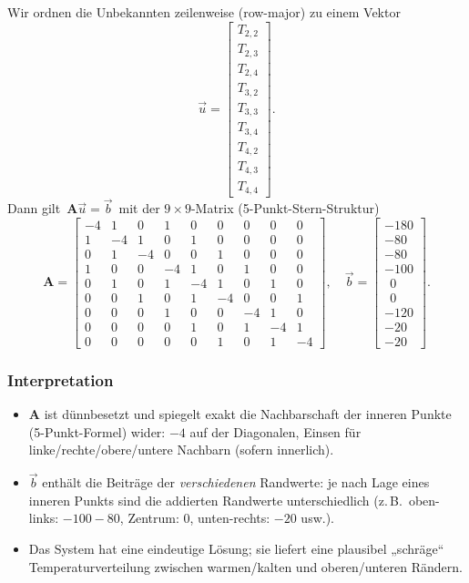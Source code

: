 Wir ordnen die Unbekannten zeilenweise (row-major) zu einem Vektor
\[
\vec{u} =
\begin{bmatrix}
	T_{2,2} \\ T_{2,3} \\ T_{2,4} \\
	T_{3,2} \\ T_{3,3} \\ T_{3,4} \\
	T_{4,2} \\ T_{4,3} \\ T_{4,4}
\end{bmatrix}.
\]
Dann gilt $\,\mathbf{A}\vec{u}=\vec{b}\,$ mit der $9\times 9$-Matrix (5-Punkt-Stern-Struktur)
\[
\mathbf{A}=
\begin{bmatrix}
	-4& 1& 0& 1& 0& 0& 0& 0& 0\\
	1&-4& 1& 0& 1& 0& 0& 0& 0\\
	0& 1&-4& 0& 0& 1& 0& 0& 0\\
	1& 0& 0&-4& 1& 0& 1& 0& 0\\
	0& 1& 0& 1&-4& 1& 0& 1& 0\\
	0& 0& 1& 0& 1&-4& 0& 0& 1\\
	0& 0& 0& 1& 0& 0&-4& 1& 0\\
	0& 0& 0& 0& 1& 0& 1&-4& 1\\
	0& 0& 0& 0& 0& 1& 0& 1&-4
\end{bmatrix},
\quad
\vec{b}=
\begin{bmatrix}
	-180 \\ -80 \\ -80 \\
	-100 \\ \ \ 0 \\ \ \ 0 \\
	-120 \\ -20 \\ -20
\end{bmatrix}.
\]

\subsubsection*{Interpretation}
\begin{itemize}
	\item \(\mathbf{A}\) ist dünnbesetzt und spiegelt exakt die Nachbarschaft der inneren Punkte (5-Punkt-Formel) wider:
	\(-4\) auf der Diagonalen, Einsen für linke/rechte/obere/untere Nachbarn (sofern innerlich).
	\item \(\vec{b}\) enthält die Beiträge der \emph{verschiedenen} Randwerte:
	je nach Lage eines inneren Punkts sind die addierten Randwerte unterschiedlich
	(z.\,B.\ oben-links: \(-100-80\), Zentrum: \(0\), unten-rechts: \(-20\) usw.).
	\item Das System hat eine eindeutige Lösung; sie liefert eine plausibel „schräge“ Temperaturverteilung
	zwischen warmen/kalten und oberen/unteren Rändern.
\end{itemize}




